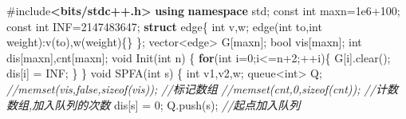 \documentclass[
]{article}
\newenvironment{Shaded}{}{}
\newcommand{\AttributeTok}[1]{\textcolor[rgb]{0.49,0.56,0.16}{#1}}
\newcommand{\CommentTok}[1]{\textcolor[rgb]{0.38,0.63,0.69}{\textit{#1}}}
\newcommand{\ControlFlowTok}[1]{\textcolor[rgb]{0.00,0.44,0.13}{\textbf{#1}}}
\newcommand{\DataTypeTok}[1]{\textcolor[rgb]{0.56,0.13,0.00}{#1}}
\newcommand{\DecValTok}[1]{\textcolor[rgb]{0.25,0.63,0.44}{#1}}
\newcommand{\FloatTok}[1]{\textcolor[rgb]{0.25,0.63,0.44}{#1}}
\newcommand{\ImportTok}[1]{\textcolor[rgb]{0.00,0.50,0.00}{\textbf{#1}}}
\newcommand{\KeywordTok}[1]{\textcolor[rgb]{0.00,0.44,0.13}{\textbf{#1}}}
\newcommand{\NormalTok}[1]{#1}
\newcommand{\OperatorTok}[1]{\textcolor[rgb]{0.40,0.40,0.40}{#1}}
\newcommand{\PreprocessorTok}[1]{\textcolor[rgb]{0.74,0.48,0.00}{#1}}
\begin{document}
\begin{Shaded}
\begin{Highlighting}[]
\PreprocessorTok{\#include}\ImportTok{\textless{}bits/stdc++.h\textgreater{}}
\KeywordTok{using} \KeywordTok{namespace}\NormalTok{ std}\OperatorTok{;}
\AttributeTok{const} \DataTypeTok{int}\NormalTok{ maxn}\OperatorTok{=}\FloatTok{1e6}\OperatorTok{+}\DecValTok{100}\OperatorTok{;}
\AttributeTok{const} \DataTypeTok{int}\NormalTok{ INF}\OperatorTok{=}\DecValTok{2147483647}\OperatorTok{;}
\KeywordTok{struct}\NormalTok{ edge}\OperatorTok{\{}
	\DataTypeTok{int}\NormalTok{ v}\OperatorTok{,}\NormalTok{w}\OperatorTok{;}
\NormalTok{	edge}\OperatorTok{(}\DataTypeTok{int}\NormalTok{ to}\OperatorTok{,}\DataTypeTok{int}\NormalTok{ weight}\OperatorTok{):}\NormalTok{v}\OperatorTok{(}\NormalTok{to}\OperatorTok{),}\NormalTok{w}\OperatorTok{(}\NormalTok{weight}\OperatorTok{)\{\}}
\OperatorTok{\};}
\NormalTok{vector}\OperatorTok{\textless{}}\NormalTok{edge}\OperatorTok{\textgreater{}}\NormalTok{ G}\OperatorTok{[}\NormalTok{maxn}\OperatorTok{];}
\DataTypeTok{bool}\NormalTok{ vis}\OperatorTok{[}\NormalTok{maxn}\OperatorTok{];}
\DataTypeTok{int}\NormalTok{ dis}\OperatorTok{[}\NormalTok{maxn}\OperatorTok{],}\NormalTok{cnt}\OperatorTok{[}\NormalTok{maxn}\OperatorTok{];}
\DataTypeTok{void}\NormalTok{ Init}\OperatorTok{(}\DataTypeTok{int}\NormalTok{ n}\OperatorTok{)}  
\OperatorTok{\{}  
    \ControlFlowTok{for}\OperatorTok{(}\DataTypeTok{int}\NormalTok{ i}\OperatorTok{=}\DecValTok{0}\OperatorTok{;}\NormalTok{i}\OperatorTok{\textless{}=}\NormalTok{n}\OperatorTok{+}\DecValTok{2}\OperatorTok{;++}\NormalTok{i}\OperatorTok{)\{}  
\NormalTok{        G}\OperatorTok{[}\NormalTok{i}\OperatorTok{].}\NormalTok{clear}\OperatorTok{();}  
\NormalTok{        dis}\OperatorTok{[}\NormalTok{i}\OperatorTok{]} \OperatorTok{=}\NormalTok{ INF}\OperatorTok{;}  
    \OperatorTok{\}}  
\OperatorTok{\}}  
\DataTypeTok{void}\NormalTok{ SPFA}\OperatorTok{(}\DataTypeTok{int}\NormalTok{ s}\OperatorTok{)}  
\OperatorTok{\{}  
    \DataTypeTok{int}\NormalTok{ v1}\OperatorTok{,}\NormalTok{v2}\OperatorTok{,}\NormalTok{w}\OperatorTok{;} 
\NormalTok{    queue}\OperatorTok{\textless{}}\DataTypeTok{int}\OperatorTok{\textgreater{}}\NormalTok{ Q}\OperatorTok{;}  
    \CommentTok{//memset(vis,false,sizeof(vis)); //标记数组}
    \CommentTok{//memset(cnt,0,sizeof(cnt)); //计数数组,加入队列的次数}
\NormalTok{    dis}\OperatorTok{[}\NormalTok{s}\OperatorTok{]} \OperatorTok{=} \DecValTok{0}\OperatorTok{;}  
\NormalTok{    Q}\OperatorTok{.}\NormalTok{push}\OperatorTok{(}\NormalTok{s}\OperatorTok{);} \CommentTok{//起点加入队列}

\end{Highlighting}
\end{Shaded}
\end{document}
